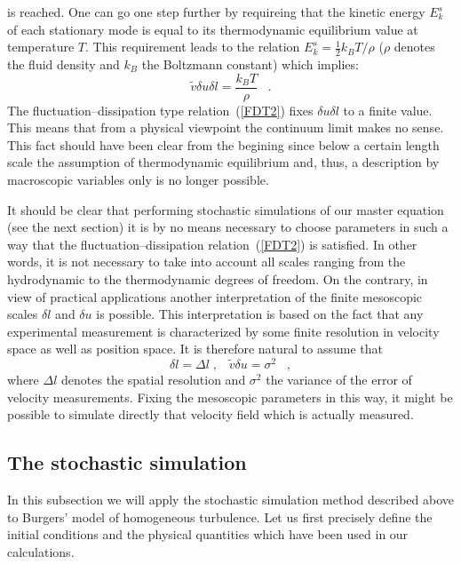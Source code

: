 is reached. One can go one step further by requireing that the
kinetic energy
$E_{k}^{s}$ of each stationary mode is equal to its thermodynamic
equilibrium value at temperature $T$. This requirement leads to
the relation
$E_{k}^{s} = \frac{1}{2} k_B T / \rho$ ($\rho$ denotes the
fluid density
and $k_{B}$ the Boltzmann constant) which implies:
\begin{equation}
\tilde{v} \delta u \delta l = \frac{k_B T}{\rho}
\;\;\; .   \label{FDT2}
\end{equation}
The fluctuation--dissipation type relation~(\ref{FDT2})
fixes $\delta u \delta l$
to a finite value. This means that from a physical viewpoint
the continuum limit makes no sense. This fact should have been clear
from the begining since below a certain length scale the assumption
of thermodynamic equilibrium and, thus, a description by
macroscopic variables only is no longer possible.

It should be clear that performing stochastic simulations
of our master equation (see the next section) it is by no means
necessary to choose parameters in such a way that the
fluctuation--dissipation relation~(\ref{FDT2}) is satisfied. In other
words, it is not necessary to take into account
all scales ranging from the hydrodynamic to the
thermodynamic degrees of freedom. On the contrary, 
in view of practical applications another interpretation of
the finite mesoscopic scales $\delta l$ and $\delta u$ is possible.
This interpretation is based on the fact that any experimental
measurement
is characterized by some finite resolution in velocity space as
well as position space. It is therefore natural to assume that
\[ \delta l = \Delta l \; , \;\;\;
\tilde{v} \delta u = \sigma^2  \;\;\; , \]
where $\Delta l$ denotes the spatial resolution and $\sigma^2$ the
variance of the error of velocity measurements. Fixing the
mesoscopic
parameters in this way, it might be possible to simulate
directly that
velocity field which is actually measured.

\subsection{The stochastic simulation}
In this subsection we will apply the stochastic simulation method
described above to Burgers' model of homogeneous turbulence.
Let us first
precisely define the initial conditions and the physical quantities
which have been used in our calculations.

